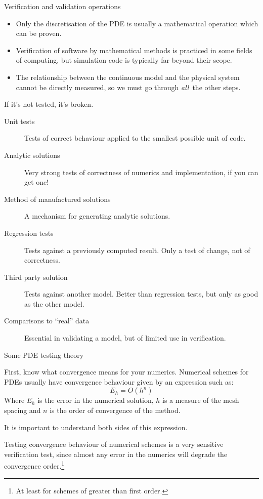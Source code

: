 \documentclass[t]{beamer}
\begin{document}
\begin{frame}{Verification and validation operations}
  
  \begin{itemize}
  \item Only the discretisation of the PDE is usually a mathematical
    operation which can be proven.
  \item Verification of software by mathematical methods is practiced in
    some fields of computing, but simulation code is typically far beyond
    their scope.
  \item The relationship between the continuous model and the physical
    system cannot be directly measured, so we must go through \emph{all}\
    the other steps. 
  \end{itemize}
  
\end{frame}

\begin{frame}{If it's not tested, it's broken.}
  
  \begin{description}
  \item[Unit tests] Tests of correct behaviour applied to the smallest
    possible unit of code.
  \item[Analytic solutions] Very strong tests of correctness of numerics and
    implementation, if you can get one!
  \item[Method of manufactured solutions] A mechanism for generating
    analytic solutions.
  \item[Regression tests] Tests against a previously computed result. Only a
    test of change, not of correctness.
  \item[Third party solution] Tests against another model. Better than
    regression tests, but only as good as the other model.
  \item[Comparisons to ``real'' data] Essential in validating a model, but of
    limited use in verification.
  \end{description}

\end{frame}

\begin{frame}{Some PDE testing theory}

  First, know what convergence means for your numerics. Numerical schemes
  for PDEs usually have convergence behaviour given by an expression such
  as:
  \begin{equation}
    E_h=O(h^n)
  \end{equation}
  Where $E_h$ is the error in the numerical solution, $h$ is a measure of the
  mesh spacing and $n$ is the order of convergence of the method.
  
  It is important to understand both sides of this expression.

  \hfill{}

  Testing convergence behaviour of numerical schemes is a very sensitive
  verification test, since almost any error in the numerics will degrade the
  convergence order.\footnote{At least for schemes of greater than first order.}

\end{frame}
\end{document}

